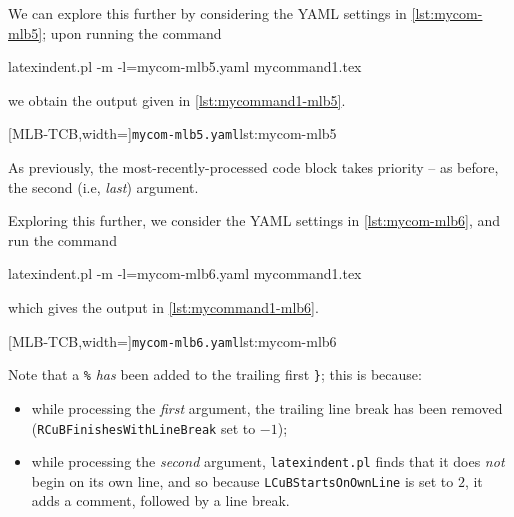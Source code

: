  \begin{example}
 We can explore this further by considering the YAML settings in \cref{lst:mycom-mlb5};
 upon running the command  

 \begin{commandshell}
latexindent.pl -m -l=mycom-mlb5.yaml mycommand1.tex
\end{commandshell}

 we obtain the output given in \cref{lst:mycommand1-mlb5}.

 \begin{cmhtcbraster}[raster column skip=.05\linewidth]
  [MLB-TCB,width=\linewidth]{\texttt{mycom-mlb5.yaml}}{lst:mycom-mlb5}
 \end{cmhtcbraster}

 As previously, the most-recently-processed code block takes priority -- as before, the
 second (i.e, \emph{last}) argument.

 Exploring this further, we consider the YAML settings in \cref{lst:mycom-mlb6}, and run
 the command

 \begin{commandshell}
latexindent.pl -m -l=mycom-mlb6.yaml mycommand1.tex
\end{commandshell}

 which gives the output in \cref{lst:mycommand1-mlb6}.

 \begin{cmhtcbraster}[raster column skip=.05\linewidth]
  [MLB-TCB,width=\linewidth]{\texttt{mycom-mlb6.yaml}}{lst:mycom-mlb6}
 \end{cmhtcbraster}

 Note that a \lstinline!%! \emph{has} been added to the trailing first \lstinline!}!;
 this is because:
 \begin{itemize}
  \item while processing the \emph{first} argument, the trailing line break has been
        removed (\texttt{RCuBFinishesWithLineBreak} set to $-1$);
  \item while processing the \emph{second} argument, \texttt{latexindent.pl} finds that
        it does \emph{not} begin on its own line, and so because
        \texttt{LCuBStartsOnOwnLine} is set to $2$, it adds a comment, followed by a line
        break.
 \end{itemize}
 \end{example}


